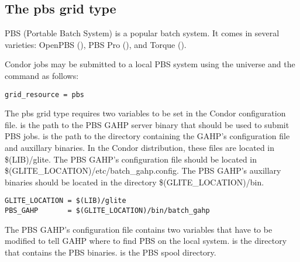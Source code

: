 
\subsection{\label{sec:PBS}The pbs grid type }

PBS (Portable Batch System) is a popular batch system. It comes in
several varieties: OpenPBS (),
PBS Pro (), and
Torque
().

Condor jobs may be submitted to a local PBS system
using the  universe and the
 command as follows:
\begin{verbatim}
grid_resource = pbs
\end{verbatim}

The pbs grid type requires two variables to be set in the Condor
configuration file.
 is the path to the PBS GAHP server binary that should be
used to submit PBS jobs.
 is the path to the directory containing the GAHP's
configuration file and auxillary binaries.
In the Condor distribution, these files are located in \$(LIB)/glite.
The PBS GAHP's configuration file should be located in
\$(GLITE\_LOCATION)/etc/batch\_gahp.config. The PBS GAHP's auxillary binaries
should be located in the directory \$(GLITE\_LOCATION)/bin.

\begin{verbatim}
GLITE_LOCATION = $(LIB)/glite
PBS_GAHP       = $(GLITE_LOCATION)/bin/batch_gahp
\end{verbatim}

The PBS GAHP's configuration file contains two variables that have to be
modified to tell GAHP where to find PBS on the local system.
 is the directory that contains the PBS binaries.
 is the PBS spool directory.

